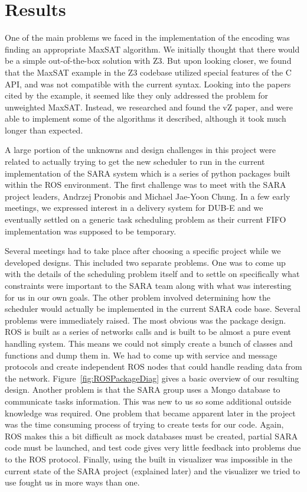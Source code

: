 \documentclass{article}
\begin{document}
\section{Results}
One of the main problems we faced
in the implementation of the encoding
was finding an appropriate MaxSAT algorithm.
We initially thought that there would be a simple
out-of-the-box solution with Z3.
But upon looking closer,
we found that the MaxSAT example
in the Z3 codebase
utilized special features of the C API,
and was not compatible with the current syntax.
Looking into the papers cited by the example,
it seemed like they only addressed the problem
for unweighted MaxSAT.
Instead, we researched and found the vZ paper,
and were able to implement some of the algorithms
it described,
although it took much longer than expected.

A large portion of the unknowns and design challenges in this project were related to actually trying to get the new scheduler to run in the current implementation of the SARA system which is a series of python packages built within the ROS environment. The first challenge was to meet with the SARA project leaders, Andrzej Pronobis and Michael Jae-Yoon Chung. In a few early meetings, we expressed interest in a delivery system for DUB-E and we eventually settled on a generic task scheduling problem as their current FIFO implementation was supposed to be temporary.

Several meetings had to take place after choosing a specific project while we developed designs. This included two separate problems. One was to come up with the details of the scheduling problem itself and to settle on specifically what constraints were important to the SARA team along with what was interesting for us in our own goals. The other problem involved determining how the scheduler would actually be implemented in the current SARA code base. Several problems were immediately raised. The most obvious was the package design. ROS is built as a series of networks calls and is built to be almost a pure event handling system. This means we could not simply create a bunch of classes and functions and dump them in. We had to come up with service and message protocols and create independent ROS nodes that could handle reading data from the network. Figure~\ref{fig:ROSPackageDiag} gives a basic overview of our resulting design. Another problem is that the SARA group uses a Mongo database to communicate tasks information. This was new to us so some additional outside knowledge was required. One problem that became apparent later in the project was the time consuming process of trying to create tests for our code. Again, ROS makes this a bit difficult as mock databases must be created, partial SARA code must be launched, and test code gives very little feedback into problems due to the ROS protocol. Finally, using the built in visualizer was impossible in the current state of the SARA project (explained later) and the visualizer we tried to use fought us in more ways than one.
\end{document}
